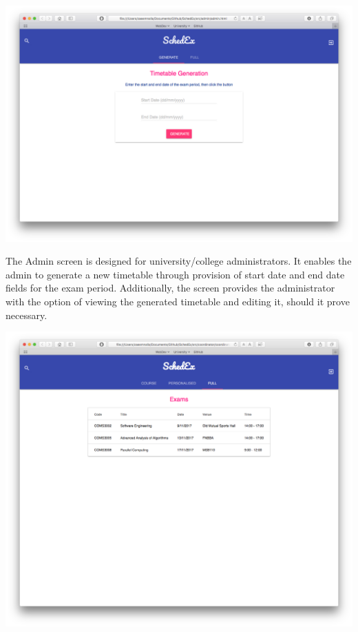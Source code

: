 \documentclass{article}
\begin{document}
\centerline{\includegraphics[scale=0.4]{admin_generate}}


The Admin screen is designed for university/college administrators. It enables the admin to generate a new timetable through provision of start date and end date fields for the exam period. Additionally, the screen provides the administrator with the option of viewing the generated timetable and editing it, should it prove necessary. 

\centerline{\includegraphics[scale=0.4]{coordinator_full}}
\end{document}
